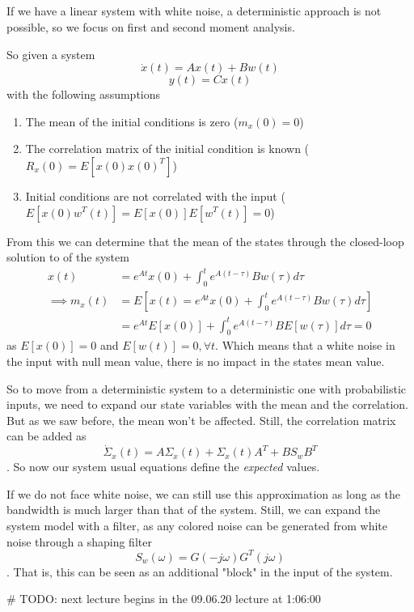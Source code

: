 \subsection*{}

If we have a linear system with white noise, a deterministic approach is not possible, so we focus on first and second moment analysis.

So given a system \[
    \dot{x}(t) = Ax(t) + Bw(t)
\] \[
y(t) = Cx(t)
\] with the following assumptions
\begin{enumerate}
    \item The mean of the initial conditions is zero ($m_x(0)=0$)
    \item The correlation matrix of the initial condition is known ($R_x(0)=E\left[ x(0)x(0)^{T} \right] $)
    \item Initial conditions are not correlated with the input ($E\left[ x(0)w^{T}(t) \right] = E\left[ x(0) \right] E\left[ w^{T}(t) \right] =0$)
\end{enumerate}

From this we can determine that the mean of the states through the closed-loop solution to of the system 
\begin{equation*}
    \begin{split}
	x(t) &= e^{At}x(0) + \int_0^{t}e^{A(t-\tau)}Bw(\tau)d\tau \\
	\implies m_x(t) &= E\left[ x(t) = e^{At}x(0) + \int_0^{t}e^{A(t-\tau)}Bw(\tau)d\tau \right] \\
			&= e^{At}E\left[ x(0) \right] + \int_0^{t}e^{A(t-\tau)}BE\left[w(\tau)\right]d\tau = 0
    \end{split}
\end{equation*}
as $E\left[ x(0) \right] =0$ and $E\left[ w(t) \right] =0, \forall t$. Which means that a white noise in the input with null mean value, there is no impact in the states mean value.

So to move from a deterministic system to a deterministic one with probabilistic inputs, we need to expand our state variables with the mean and the correlation. But as we saw before, the mean won't be affected. Still, the correlation matrix can be added as \[
    \dot{\Sigma}_x(t) = A\Sigma_x(t) + \Sigma_x(t)A^{T}+BS_wB^{T}
\] . So now our system usual equations define the \emph{expected} values. 

If we do not face white noise, we can still use this approximation as long as the bandwidth is much larger than that of the system. Still, we can expand the system model with a filter, as any colored noise can be generated from white noise through a shaping filter \[
    S_w(\omega) = G(-j\omega)G^{T}(j\omega)
\]. That is, this can be seen as an additional "block" in the input of the system.

# TODO: next lecture begins in the 09.06.20 lecture at 1:06:00
